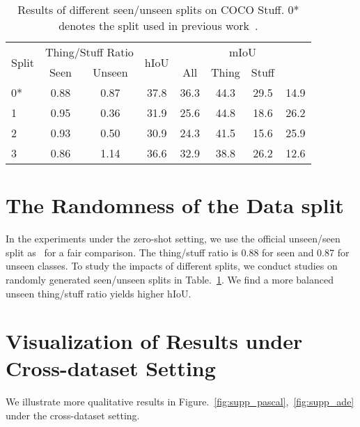 \documentclass[runningheads]{llncs}
\begin{document}
\begin{table}[]
\footnotesize
    \centering
    \caption{\footnotesize Results of different seen/unseen splits on COCO Stuff. 0* denotes the split used in previous work~\cite{xian2019semantic}.}
    \begin{tabular}{l|c|c|c|c|c|c|c}
    \toprule
    \multirow{2}{*}{Split}&\multicolumn{2}{c|}{Thing/Stuff Ratio}&\multirow{2}{*}{hIoU}&\multicolumn{4}{c}{mIoU}\\
    \cline{2-3} \cline{5-8}
    &Seen&Unseen&&All&Thing & Stuff &  \\
     \hline
     0*&0.88&0.87&37.8&36.3 &44.3 &29.5 &14.9\\
     \hline
     1&0.95&0.36&31.9&25.6&44.8&18.6&26.2\\
     2&0.93&0.50&30.9&	24.3&	41.5&	15.6&25.9\\
     3&0.86&1.14&36.6&32.9&38.8&26.2&12.6\\
     \bottomrule
    \end{tabular}
    \label{tab:randomness_of_split}
    \vspace{-2em}
\end{table}

\section{The Randomness of the Data split}
In the experiments under the zero-shot setting, we use the official unseen/seen split as~\cite{xian2019semantic} for a fair comparison. The thing/stuff ratio is 0.88 for seen and 0.87 for unseen classes. To study the impacts of different splits, we conduct studies on randomly generated seen/unseen splits in Table.~\ref{tab:randomness_of_split}. We find a more balanced unseen thing/stuff ratio yields higher hIoU.

\section{Visualization of Results under Cross-dataset Setting}
We illustrate more qualitative results in Figure.~\ref{fig:supp_pascal},~\ref{fig:supp_ade} under the cross-dataset setting. 
\end{document}
